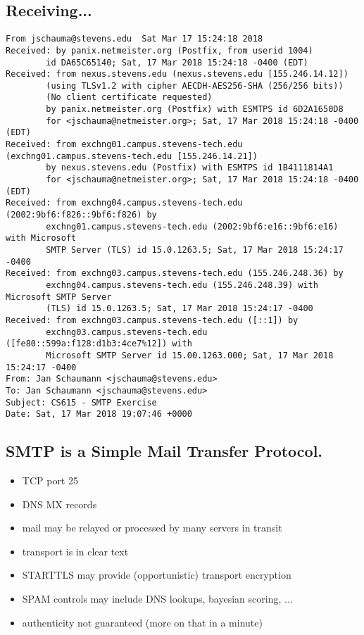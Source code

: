 \documentclass[xga]{xdvislides}
\begin{document}
\subsection{Receiving...}
\smallish
\begin{verbatim}
From jschauma@stevens.edu  Sat Mar 17 15:24:18 2018                                                 
Received: by panix.netmeister.org (Postfix, from userid 1004)
        id DA65C65140; Sat, 17 Mar 2018 15:24:18 -0400 (EDT)
Received: from nexus.stevens.edu (nexus.stevens.edu [155.246.14.12])
        (using TLSv1.2 with cipher AECDH-AES256-SHA (256/256 bits))
        (No client certificate requested)
        by panix.netmeister.org (Postfix) with ESMTPS id 6D2A1650D8
        for <jschauma@netmeister.org>; Sat, 17 Mar 2018 15:24:18 -0400 (EDT)
Received: from exchng01.campus.stevens-tech.edu (exchng01.campus.stevens-tech.edu [155.246.14.21])
        by nexus.stevens.edu (Postfix) with ESMTPS id 1B4111814A1
        for <jschauma@netmeister.org>; Sat, 17 Mar 2018 15:24:18 -0400 (EDT)
Received: from exchng04.campus.stevens-tech.edu (2002:9bf6:f826::9bf6:f826) by
        exchng01.campus.stevens-tech.edu (2002:9bf6:e16::9bf6:e16) with Microsoft
        SMTP Server (TLS) id 15.0.1263.5; Sat, 17 Mar 2018 15:24:17 -0400
Received: from exchng03.campus.stevens-tech.edu (155.246.248.36) by
        exchng04.campus.stevens-tech.edu (155.246.248.39) with Microsoft SMTP Server
        (TLS) id 15.0.1263.5; Sat, 17 Mar 2018 15:24:17 -0400
Received: from exchng03.campus.stevens-tech.edu ([::1]) by
        exchng03.campus.stevens-tech.edu ([fe80::599a:f128:d1b3:4ce7%12]) with
        Microsoft SMTP Server id 15.00.1263.000; Sat, 17 Mar 2018 15:24:17 -0400
From: Jan Schaumann <jschauma@stevens.edu>
To: Jan Schaumann <jschauma@stevens.edu>
Subject: CS615 - SMTP Exercise
Date: Sat, 17 Mar 2018 19:07:46 +0000
\end{verbatim}
\Normalsize

\subsection{SMTP is a Simple Mail Transfer Protocol.}

\begin{itemize}
	\item TCP port 25
	\item DNS MX records
	\item mail may be relayed or processed by many servers in transit
	\item transport is in clear text
	\item STARTTLS may provide (opportunistic) transport encryption
	\item SPAM controls may include DNS lookups, bayesian scoring, ...
	\item authenticity not guaranteed (more on that in a minute)
\end{itemize}
\end{document}
